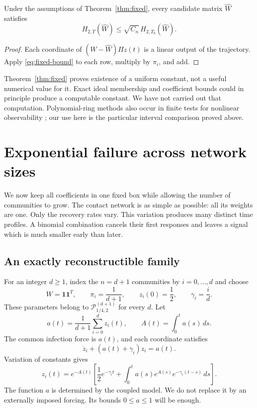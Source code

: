 \begin{corollary}
\label{cor:fixed-residual}
Under the assumptions of Theorem~\ref{thm:fixed}, every candidate matrix $\widehat W$ satisfies
\[
 H_{2,T}(\widehat W)\leq\sqrt{C_n}\,H_{2,T_0}(\widehat W).
\]
\end{corollary}

\begin{proof}
Each coordinate of $(W-\widehat W)\Pi z(t)$ is a linear output of the trajectory. Apply \eqref{eq:fixed-bound} to each row, multiply by $\pi_i$, and add.
\end{proof}

Theorem~\ref{thm:fixed} proves existence of a uniform constant, not a useful numerical value for it. Exact ideal membership and coefficient bounds could in principle produce a computable constant. We have not carried out that computation. Polynomial-ring methods also occur in finite tests for nonlinear observability \cite{KO2013}; our use here is the particular interval comparison proved above.

\section{Exponential failure across network sizes}
\label{sec:negative}

We now keep all coefficients in one fixed box while allowing the number of communities to grow. The contact network is as simple as possible: all its weights are one. Only the recovery rates vary. This variation produces many distinct time profiles. A binomial combination cancels their first responses and leaves a signal which is much smaller early than later.

\subsection{An exactly reconstructible family}

For an integer $d\geq1$, index the $n=d+1$ communities by $i=0,\ldots,d$ and choose
\begin{equation}
 W=\mathbf1\mathbf1^T,\qquad
 \pi_i=\frac1{d+1},\qquad
 z_i(0)=\frac12,\qquad
 \gamma_i=\frac{i}{d}.
 \label{eq:negative-family}
\end{equation}
These parameters belong to $\mathcal P_{1/4,2}^{(d+1)}$ for every $d$. Let
\[
 a(t)=\frac1{d+1}\sum_{i=0}^dz_i(t),\qquad
 A(t)=\int_0^ta(s)\,ds.
\]
The common infection force is $a(t)$, and each coordinate satisfies
\[
 \dot z_i+(a(t)+\gamma_i)z_i=a(t).
\]
Variation of constants gives
\begin{equation}
 z_i(t)=e^{-A(t)}\left[
  \frac12e^{-\gamma_it}
  +\int_0^ta(s)e^{A(s)}e^{-\gamma_i(t-s)}\,ds
 \right].
 \label{eq:variation}
\end{equation}
The function $a$ is determined by the coupled model. We do not replace it by an externally imposed forcing. Its bounds $0\leq a\leq1$ will be enough.

